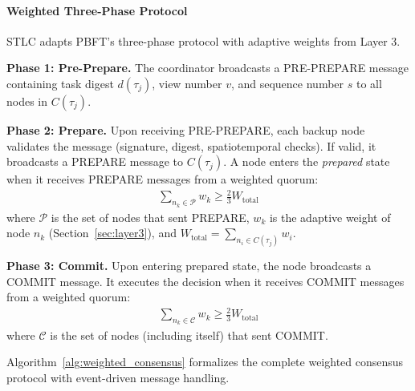 \documentclass[lettersize,journal]{IEEEtran}
\begin{document}
\paragraph{Weighted Three-Phase Protocol}
\label{sec:three_phase}

STLC adapts PBFT's three-phase protocol with adaptive weights from Layer 3.

\textbf{Phase 1: Pre-Prepare.}
The coordinator broadcasts a PRE-PREPARE message containing task digest
$d(\tau_j)$, view number $v$, and sequence number $s$ to all nodes in
$C(\tau_j)$.

\textbf{Phase 2: Prepare.}
Upon receiving PRE-PREPARE, each backup node validates the message
(signature, digest, spatiotemporal checks). If valid, it broadcasts a
PREPARE message to $C(\tau_j)$. A node enters the \textit{prepared} state
when it receives PREPARE messages from a weighted quorum:
\begin{equation}
\begin{aligned}
\sum_{n_k \in \mathcal{P}} w_k \geq \frac{2}{3} W_{\text{total}}
\label{eq:weighted_quorum}
\end{aligned}
\end{equation}
where $\mathcal{P}$ is the set of nodes that sent PREPARE, $w_k$ is the
adaptive weight of node $n_k$ (Section~\ref{sec:layer3}), and
$W_{\text{total}} = \sum_{n_i \in C(\tau_j)} w_i$.

\textbf{Phase 3: Commit.}
Upon entering prepared state, the node broadcasts a COMMIT message. It
executes the decision when it receives COMMIT messages from a weighted
quorum:
\begin{equation}
\begin{aligned}
\sum_{n_k \in \mathcal{C}} w_k \geq \frac{2}{3} W_{\text{total}}
\label{eq:commit_quorum}
\end{aligned}
\end{equation}
where $\mathcal{C}$ is the set of nodes (including itself) that sent COMMIT.

Algorithm~\ref{alg:weighted_consensus} formalizes the complete weighted consensus
protocol with event-driven message handling.
\end{document}
